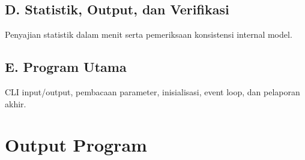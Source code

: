 \documentclass[a4paper,10pt]{article}
\begin{document}
\subsection*{D. Statistik, Output, dan Verifikasi}
\noindent Penyajian statistik dalam menit serta pemeriksaan konsistensi internal model.


\subsection*{E. Program Utama}
\noindent CLI input/output, pembacaan parameter, inisialisasi, event loop, dan pelaporan akhir.


\newpage
\section*{Output Program}

\end{document}
